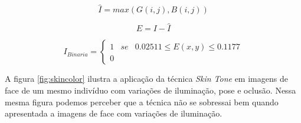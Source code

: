 \begin{equation}
\label{eq:skin_max}
\hat{I} = max (G(i,j), B(i,j))
\end{equation}



\begin{equation}
\label{eq:skin_erro}
E = I - \hat{I}
\end{equation}

\begin{equation}
\label{eq:skin_binario}
I_{Binaria} = \left\{\begin{matrix}
1 & se & 0.02511 \leq E(x,y) \leq 0.1177 \\ 
0 &
\end{matrix}\right.
\end{equation}



%
%
%
%     
%
%     
%     
%             
%      
%

A figura \ref{fig:skincolor} ilustra a aplicação da técnica \textit{Skin Tone} em imagens de face de um mesmo indivíduo com variações de iluminação, pose e oclusão. Nessa mesma figura podemos perceber que a técnica não se sobressai bem quando apresentada a imagens de face com variações de iluminação.

